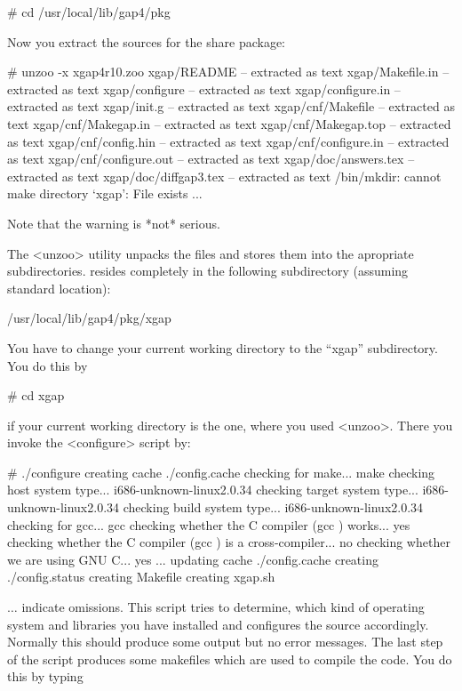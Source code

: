 \begintt
# cd /usr/local/lib/gap4/pkg
\endtt

Now you extract the sources for the {\XGAP} share package:

\begintt
# unzoo -x xgap4r10.zoo
xgap/README     -- extracted as text
xgap/Makefile.in        -- extracted as text
xgap/configure  -- extracted as text
xgap/configure.in       -- extracted as text
xgap/init.g     -- extracted as text
xgap/cnf/Makefile       -- extracted as text
xgap/cnf/Makegap.in     -- extracted as text
xgap/cnf/Makegap.top    -- extracted as text
xgap/cnf/config.hin     -- extracted as text
xgap/cnf/configure.in   -- extracted as text
xgap/cnf/configure.out  -- extracted as text
xgap/doc/answers.tex    -- extracted as text
xgap/doc/diffgap3.tex   -- extracted as text
/bin/mkdir: cannot make directory `xgap': File exists
...
\endtt

Note that the warning is *not* serious.

The <unzoo> utility unpacks the files and stores them into the apropriate
subdirectories. {\XGAP} resides completely in the following subdirectory
(assuming standard location):

\begintt
/usr/local/lib/gap4/pkg/xgap
\endtt


You have to change your current working directory to the ``xgap''
subdirectory. You do this by

\begintt
# cd xgap
\endtt

if your current working directory is the one, where you used
<unzoo>. There you invoke the <configure> script by:

\begintt
# ./configure
creating cache ./config.cache
checking for make... make
checking host system type... i686-unknown-linux2.0.34
checking target system type... i686-unknown-linux2.0.34
checking build system type... i686-unknown-linux2.0.34
checking for gcc... gcc
checking whether the C compiler (gcc  ) works... yes
checking whether the C compiler (gcc  ) is a cross-compiler... no
checking whether we are using GNU C... yes
...
updating cache ./config.cache
creating ./config.status
creating Makefile
creating xgap.sh
\endtt

$\ldots$ indicate omissions. 
This script tries to determine, which kind of operating system and
libraries you have installed and configures the source
accordingly. Normally this should produce some output but no error
messages. The last step of the script produces some makefiles which are
used to compile the code. You do this by typing

